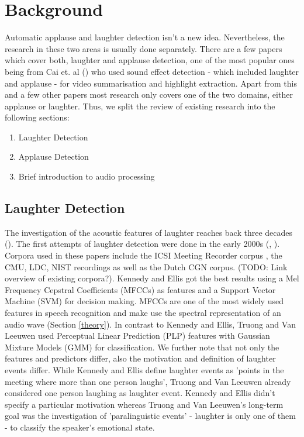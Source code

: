 \documentclass[bsc,frontabs,parskip,deptreport]{infthesis}
\begin{document}
\chapter{Background}
Automatic applause and laughter detection isn't a new idea. Nevertheless, the research in these two areas is usually done separately. There are a few papers which cover both, laughter and applause detection, one of the most popular ones being from Cai et. al (\cite{cai2003highlight}) who used sound effect detection - which included laughter and applause - for video summarisation and highlight extraction.
Apart from this and a few other papers most research only covers one of the two domains, either applause or laughter. Thus, we split the review of existing research into the following sections:
\begin{enumerate}
  \item Laughter Detection
  \item Applause Detection
  \item Brief introduction to audio processing
\end{enumerate}


\section{Laughter Detection}
The investigation of the acoustic features of laughter reaches back three decades (\cite{bickley1992acoustic}). The first attempts of laughter detection were done in the early 2000s (\cite{kennedy2004laughter}, \cite{truong2005automatic}). Corpora used in these papers include the ICSI Meeting Recorder corpus \cite{morgan2001meeting}, the CMU, LDC, NIST recordings as well as the Dutch CGN corpus. (TODO: Link overview of existing corpora?). Kennedy and Ellis got the best results using a Mel Frequency Cepstral Coefficients (MFCCs) as features and a Support Vector Machine (SVM) for decision making. 
MFCCs are one of the most widely used features in speech recognition and make use the spectral representation of an audio wave (Section \ref{theory}).
In contrast to Kennedy and Ellis, Truong and Van Leeuwen used Perceptual Linear Prediction (PLP) features with Gaussian Mixture Models (GMM) for classification. We further note that not only the features and predictors differ, also the motivation and definition of laughter events differ. While Kennedy and Ellis define laughter events as 'points in the meeting where more than one person laughs', Truong and Van Leeuwen already considered one person laughing as laughter event. Kennedy and Ellis didn't specify a particular motivation whereas Truong and Van Leeuwen's long-term goal was the investigation of 'paralinguistic events' - laughter is only one of them - to classify the speaker's emotional state.   
\end{document}
